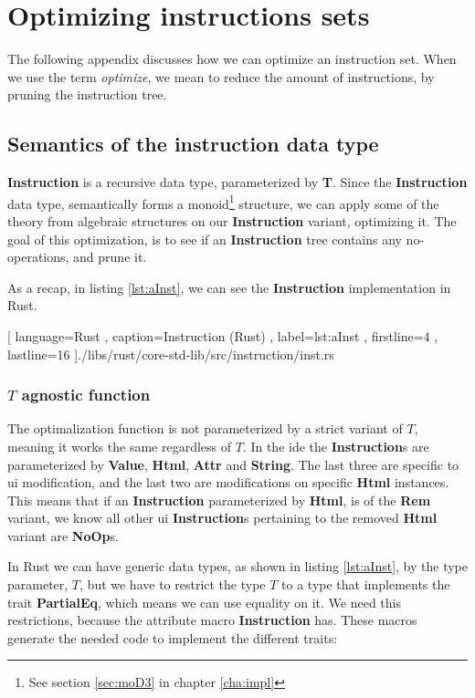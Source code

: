 \chapter{Optimizing instructions sets} \label{app:a}

The following appendix discusses how we can optimize an instruction set. When we
use the term \textit{optimize}, we mean to reduce the amount of instructions, by
pruning the instruction tree.


\section{Semantics of the instruction data type}

\textbf{Instruction} is a recursive data type, parameterized by \textbf{T}.
Since the \textbf{Instruction} data type, semantically forms a
monoid\footnote{See section \ref{sec:moD3} in chapter \ref{cha:impl}} structure,
we can apply some of the theory from algebraic structures on our 
\textbf{Instruction} variant, optimizing it. The goal of this optimization, is
to see if an \textbf{Instruction} tree contains any no-operations, and prune it.

As a recap, in listing \ref{lst:aInst}, we can see the \textbf{Instruction}
implementation in Rust.


\begin{code}[H]
  
   [ language=Rust
   , caption={Instruction (Rust)}
   , label=lst:aInst
   , firstline=4
   , lastline=16
   ]{./libs/rust/core-std-lib/src/instruction/inst.rs}
\end{code}


\subsection{$T$ agnostic function}

The optimalization function is not parameterized by a strict variant of
$T$, meaning it works the same regardless of $T$. In the \gls*{ide} the
\textbf{Instruction}s are parameterized by \textbf{Value}, \textbf{Html},
\textbf{Attr} and \textbf{String}. The last three are specific to \gls*{ui}
modification, and the last two are modifications on specific \textbf{Html}
instances. This means that if an \textbf{Instruction} parameterized by
\textbf{Html}, is of the \textbf{Rem} variant, we know all other \gls*{ui}
\textbf{Instruction}s pertaining to the removed \textbf{Html} variant are
\textbf{NoOp}s.

In Rust we can have generic data types, as shown in listing \ref{lst:aInst}, by
the type parameter, $T$, but we have to restrict the type $T$ to a type that
implements the trait \textbf{PartialEq}, which means we can use equality on it.
We need this restrictions, because the attribute macro \textbf{Instruction} has.
These macros generate the needed code to implement the different traits:

